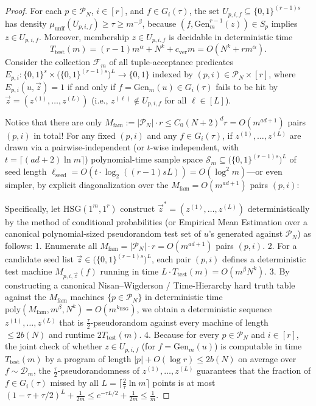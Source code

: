 \documentclass[11pt]{article}
\begin{document}
\begin{proof}
For each $p \in \mathcal{P}_N$, $i \in [r]$, and $f \in G_i(\tau)$, the set $U_{p,i,f} \subseteq \{0,1\}^{(r-1)s}$ has density $\mu_{\mathrm{unif}}(U_{p,i,f}) \ge \tau \ge m^{-\beta}$, because $(f, \mathrm{Gen}_m^{r-1}(z)) \in S_p$ implies $z \in U_{p,i,f}$. Moreover, membership $z \in U_{p,i,f}$ is decidable in deterministic time
\[
  T_{\mathrm{test}}(m) = (r-1) m^\alpha + N^k + c_{\mathrm{ver}} m = O(N^k + r m^\alpha).
\]
Consider the collection $\mathcal{F}_{m}$ of all tuple-acceptance predicates $E_{p,i} : \{0,1\}^s \times \big(\{0,1\}^{(r-1)s}\big)^L \to \{0,1\}$ indexed by $(p, i) \in \mathcal{P}_N \times [r]$, where $E_{p,i}(u, \vec{z}) = 1$ if and only if $f = \mathrm{Gen}_m(u) \in G_i(\tau)$ fails to be hit by $\vec{z} = (z^{(1)},\dots,z^{(L)})$ (i.e., $z^{(\ell)} \notin U_{p,i,f}$ for all $\ell \in [L]$).

Notice that there are only $M_{\mathrm{fam}} := |\mathcal{P}_N| \cdot r \le C_0 (N+2)^d r = O(m^{ad+1})$ pairs $(p,i)$ in total!
For any fixed $(p,i)$ and any $f \in G_i(\tau)$, if $z^{(1)},\dots,z^{(L)}$ are drawn via a pairwise-independent (or $t$-wise independent, with $t = \lceil (ad+2)\ln m \rceil$) polynomial-time sample space $\mathcal{S}_m \subseteq \big(\{0,1\}^{(r-1)s}\big)^L$ of seed length $\ell_{\mathrm{seed}} = O(t \cdot \log_2((r-1)sL)) = O(\log^2 m)$—or even simpler, by explicit diagonalization over the $M_{\mathrm{fam}} = O(m^{ad+1})$ pairs $(p,i)$:

Specifically, let $\mathrm{HSG}(1^m, 1^r)$ construct $\vec{z}^* = (z^{(1)},\dots,z^{(L)})$ deterministically by the method of conditional probabilities (or Empirical Mean Estimation over a canonical polynomial-sized pseudorandom test set of $u$'s generated against $\mathcal{P}_N$) as follows:
1. Enumerate all $M_{\mathrm{fam}} = |\mathcal{P}_N| \cdot r = O(m^{ad+1})$ pairs $(p,i)$.
2. For a candidate seed list $\vec{z} \in \big(\{0,1\}^{(r-1)s}\big)^L$, each pair $(p,i)$ defines a deterministic test machine $M_{p,i,\vec{z}}(f)$ running in time $L \cdot T_{\mathrm{test}}(m) = O(m^\beta N^k)$.
3. By constructing a canonical Nisan--Wigderson / Time-Hierarchy hard truth table against the $M_{\mathrm{fam}}$ machines $\{p \in \mathcal{P}_N\}$ in deterministic time $\mathrm{poly}(M_{\mathrm{fam}}, m^\beta, N^k) = O(m^{k_{\mathrm{HSG}}})$, we obtain a deterministic sequence $z^{(1)},\dots,z^{(L)}$ that is $\frac{\tau}{2}$-pseudorandom against every machine of length $\le 2 b(N)$ and runtime $2 T_{\mathrm{test}}(m)$.
4. Because for every $p \in \mathcal{P}_N$ and $i \in [r]$, the joint check of whether $z \in U_{p,i,f}$ (for $f = \mathrm{Gen}_m(u)$) is computable in time $T_{\mathrm{test}}(m)$ by a program of length $|p| + O(\log r) \le 2b(N)$ on average over $f \sim \mathcal{D}_m$, the $\frac{\tau}{2}$-pseudorandomness of $z^{(1)},\dots,z^{(L)}$ guarantees that the fraction of $f \in G_i(\tau)$ missed by all $L = \lceil \frac{2}{\tau} \ln m \rceil$ points is at most $(1 - \tau + \tau/2)^L + \frac{1}{2m} \le e^{-\tau L / 2} + \frac{1}{2m} \le \frac{1}{m}$.
\end{proof}
\end{document}
